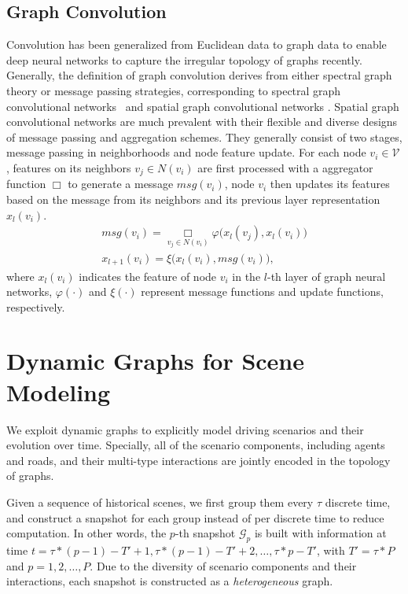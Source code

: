 \documentclass[letterpaper, 10 pt, conference]{ieeeconf}
\begin{document}
\subsection{Graph Convolution}
Convolution has been generalized from Euclidean data to graph data to enable deep neural networks to capture the irregular topology of graphs recently. Generally, the definition of graph convolution derives from either spectral graph theory or message passing strategies, corresponding to spectral graph convolutional networks~\cite{bruna2013spectral,defferrard2016convolutional,khasanova2017graph,bianchi2019graph} and spatial graph convolutional networks \cite{gilmer2017neural,velikovi2018graph,hamilton2017inductive,xu2018how}. 
Spatial graph convolutional networks are much prevalent with their flexible and diverse designs of message passing and aggregation schemes. They generally consist of two stages, message passing in neighborhoods and node feature  update. For each node $v_i \in \mathcal{V}$, features on its neighbors $v_j \in N(v_i)$ are first processed with a aggregator function $\mathop{\Box}$ to generate a message $msg(v_i)$, node $v_i$ then updates its features based on the message from its neighbors and its previous layer representation $x_l(v_i)$.
\begin{gather}
    msg(v_i)= \mathop{\Box}\limits_{v_j \in N(v_i)} \varphi \big( x_l(v_j), x_l(v_i)\big)\\
    x_{l+1}(v_i)=\xi \big(x_l(v_i), msg(v_i) \big),
\end{gather}
where $x_l(v_i)$ indicates the feature of node $v_i$ in the $l$-th layer of graph neural networks, $\varphi(\cdot)$ and $\xi(\cdot)$ represent message functions and update functions, respectively.

\section{Dynamic Graphs for Scene Modeling}
\label{sec.graph}
We exploit dynamic graphs to explicitly model driving scenarios and their evolution over time. Specially, all of the scenario components, including agents and roads, and their multi-type interactions are jointly encoded in the topology of graphs.

Given a sequence of historical scenes, we first group them every $\tau$ discrete time, and construct a snapshot for each group instead of per discrete time to reduce computation. In other words, the $p$-th snapshot $\mathcal{G}_p$ is built with information at time $t= \tau*(p-1)-T'+1, \tau*(p-1)-T'+2, \dots,  \tau*p-T'$,  with $T'=\tau  *  P $ and $p=1, 2,\dots,P$. Due to the diversity of scenario components and their interactions, each snapshot is constructed as a \textit{heterogeneous} graph.
\end{document}
